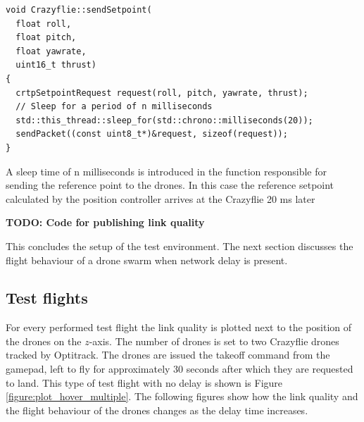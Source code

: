 \begin{code}
\begin{verbatim}
void Crazyflie::sendSetpoint(
  float roll,
  float pitch,
  float yawrate,
  uint16_t thrust)
{
  crtpSetpointRequest request(roll, pitch, yawrate, thrust);
  // Sleep for a period of n milliseconds
  std::this_thread::sleep_for(std::chrono::milliseconds(20));
  sendPacket((const uint8_t*)&request, sizeof(request));
}
\end{verbatim}
\caption{A sleep time of n milliseconds is introduced in the function responsible for sending the reference point to the drones. In this case the reference setpoint calculated by the position controller arrives at the Crazyflie 20 ms later}
\label{listing:send_setpoint_delay}
\end{code}

\textbf{TODO: Code for publishing link quality}

This concludes the setup of the test environment. The next section discusses the flight behaviour of a drone swarm when network delay is present.

\subsection{Test flights}
For every performed test flight the link quality is plotted next to the position of the drones on the $z$-axis. The number of drones is set to two Crazyflie drones tracked by Optitrack. The drones are issued the takeoff command from the gamepad, left to fly for approximately 30 seconds after which they are requested to land. This type of test flight with no delay is shown is Figure \ref{figure:plot_hover_multiple}. The following figures show how the link quality and the flight behaviour of the drones changes as the delay time increases.

